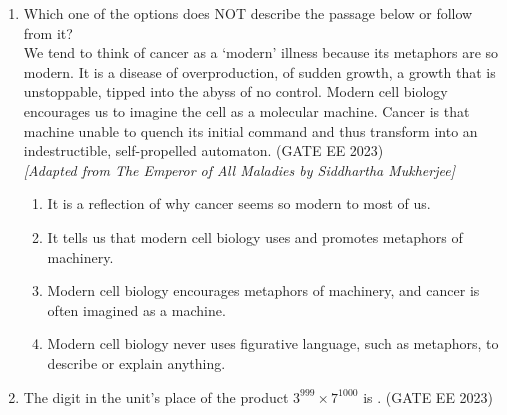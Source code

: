 \documentclass[a4paper,12pt]{exam}
\theoremstyle{remark}
\begin{document}
\begin{enumerate}
\item Which one of the options does NOT describe the passage below or follow from it? \\[0.5em]
We tend to think of cancer as a `modern' illness because its metaphors are so modern. It is a disease of overproduction, of sudden growth, a growth that is unstoppable, tipped into the abyss of no control. Modern cell biology encourages us to imagine the cell as a molecular machine. Cancer is that machine unable to quench its initial command  and thus transform into an indestructible, self-propelled automaton. \hfill{(GATE EE 2023)}\\
\textit{[Adapted from The Emperor of All Maladies by Siddhartha Mukherjee]}

\begin{enumerate}
\item It is a reflection of why cancer seems so modern to most of us.
\item It tells us that modern cell biology uses and promotes metaphors of machinery.
\item Modern cell biology encourages metaphors of machinery, and cancer is often imagined as a machine.
\item Modern cell biology never uses figurative language, such as metaphors, to describe or explain anything.
\end{enumerate}
\newpage
\item The digit in the unit's place of the product $3^{999} \times 7^{1000}$ is \underline{\hspace{1cm}}. \hfill{(GATE EE 2023)}

\begin{enumerate}
\end{enumerate}


\end{enumerate}
\end{document}
